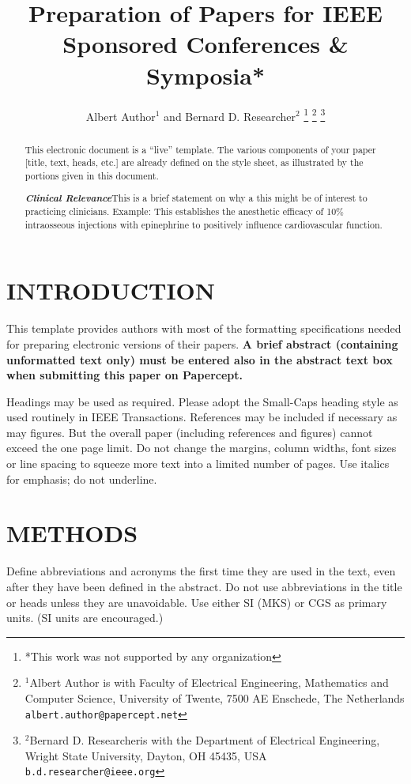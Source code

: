 \documentclass[letterpaper, 10 pt, conference]{ieeeconf}  %
\title{\LARGE \bf
Preparation of Papers for IEEE Sponsored Conferences \& Symposia*
}
\author{Albert Author$^{1}$ and Bernard D. Researcher$^{2}$%
\thanks{*This work was not supported by any organization}%
\thanks{$^{1}$Albert Author is with Faculty of Electrical Engineering, Mathematics and Computer Science,
        University of Twente, 7500 AE Enschede, The Netherlands
        {\tt\small albert.author@papercept.net}}%
\thanks{$^{2}$Bernard D. Researcheris with the Department of Electrical Engineering, Wright State University,
        Dayton, OH 45435, USA
        {\tt\small b.d.researcher@ieee.org}}%
}
\begin{document}
\maketitle
\thispagestyle{empty}
\pagestyle{empty}


\begin{abstract}

This electronic document is a “live” template. The various components of your paper [title, text, heads, etc.] are already defined on the style sheet, as illustrated by the portions given in this document.

{\textbf{\textit{Clinical Relevance}}}\textemdash This is a brief statement on why a this might be of interest to practicing clinicians. Example: This establishes the anesthetic efficacy of 10\% intraosseous injections with epinephrine to positively influence cardiovascular function.

\end{abstract}


\section{INTRODUCTION}

This template provides authors with most of the formatting specifications needed for preparing electronic versions of their papers. {\bf A brief abstract (containing unformatted text only) must be entered also in the abstract text box when submitting this paper on Papercept.}

Headings may be used as required. Please adopt the Small-Caps heading style as used routinely in IEEE Transactions. References may be included if necessary as may figures. But the overall paper (including references and figures) cannot exceed the one page limit. Do not change the margins, column widths, font sizes or line spacing to squeeze more text into a limited number of pages. Use italics for emphasis; do not underline.


\section{METHODS}

Define abbreviations and acronyms the first time they are used in the text, even after they have been defined in the abstract. Do not use abbreviations in the title or heads unless they are unavoidable. Use either SI (MKS) or CGS as primary units. (SI units are encouraged.)
\end{document}
